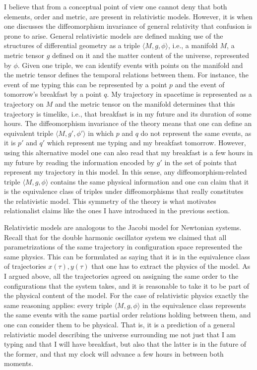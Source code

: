 \documentclass[12 pt]{article}
\begin{document}
I believe that from a conceptual point of view one cannot deny that both elements, order and metric, are present in relativistic models. However, it is when one discusses the diffeomorphism invariance of general relativity that confusion is prone to arise. General relativistic models are defined making use of the structures of differential geometry as a triple $\langle M,g,\phi \rangle$, i.e., a manifold $M$, a metric tensor $g$ defined on it and the matter content of the universe, represented by $\phi$. Given one triple, we can identify events with points on the manifold and the metric tensor defines the temporal relations between them. For instance, the event of me typing this can be represented by a point $p$ and the event of tomorrow's breakfast by a point $q$. My trajectory in spacetime is represented as a trajectory on $M$ and the metric tensor on the manifold determines that this trajectory is timelike, i.e., that breakfast is in my future and its duration of some hours. The diffeomorphism invariance of the theory means that one can define an equivalent triple $\langle M,g',\phi' \rangle$ in which $p$ and $q$ do not represent the same events, as it is $p'$ and $q'$ which represent me typing and my breakfast tomorrow. However, using this alternative model one can also read that my breakfast is a few hours in my future by reading the information encoded by $g'$ in the set of points that represent my trajectory in this model. In this sense, any diffeomorphism-related triple $\langle M,g,\phi \rangle$ contains the same physical information and one can claim that it is the equivalence class of triples under diffeomorphisms that really constitutes the relativistic model. This symmetry of the theory is what motivates relationalist claims like the ones I have introduced in the previous section.

Relativistic models are analogous to the Jacobi model for Newtonian systems. Recall that for the double harmonic oscillator system we claimed that all parametrizations of the same trajectory in configuration space represented the same physics. This can be formulated as saying that it is in the equivalence class of trajectories $x(\tau),y(\tau)$ that one has to extract the physics of the model. As I argued above, all the trajectories agreed on assigning the same order to the configurations that the system takes, and it is reasonable to take it to be part of the physical content of the model. For the case of relativistic physics exactly the same reasoning applies: every triple $\langle M, g, \phi \rangle$ in the equivalence class represents the same events with the same partial order relations holding between them, and one can consider them to be physical. That is, it is a prediction of a general relativistic model describing the universe surrounding me not just that I am typing and that I will have breakfast, but also that the latter is in the future of the former, and that my clock will advance a few hours in between both moments.
\end{document}
